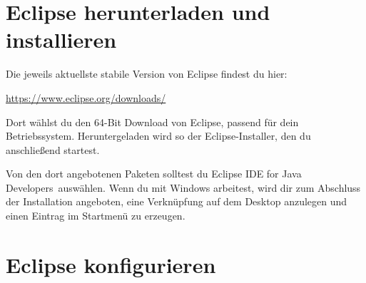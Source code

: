 % 
% 
% 
% 
% 
% 
% 

\clearpage

\section{Eclipse herunterladen und installieren}

Die jeweils aktuellste stabile Version von Eclipse findest du hier:	

\url{https://www.eclipse.org/downloads/}

Dort wählst du den 64-Bit Download von Eclipse, passend für dein Betriebssystem.
Heruntergeladen wird so der Eclipse-Installer, den du anschließend startest.

Von den dort angebotenen Paketen solltest du \glqq Eclipse IDE for Java
Developers\grqq\ auswählen. Wenn du mit Windows arbeitest, wird dir zum
Abschluss der Installation angeboten, eine Verknüpfung auf dem Desktop anzulegen
und einen Eintrag im Startmenü zu erzeugen.


\section{Eclipse konfigurieren}

